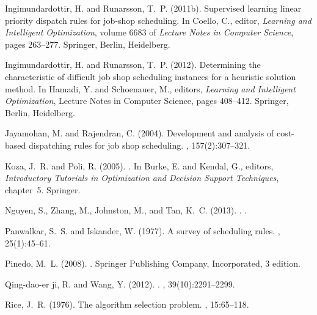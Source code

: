 \documentclass[a4paper,twoside]{article}
\begin{document}
{\begin{thebibliography}{}
Ingimundardottir, H. and Runarsson, T.~P. (2011b).
\newblock Supervised learning linear priority dispatch rules for job-shop
  scheduling.
\newblock In Coello, C., editor, {\em Learning and Intelligent Optimization},
  volume 6683 of {\em Lecture Notes in Computer Science}, pages 263--277.
  Springer, Berlin, Heidelberg.

Ingimundardottir, H. and Runarsson, T.~P. (2012).
\newblock Determining the characteristic of difficult job shop scheduling
  instances for a heuristic solution method.
\newblock In Hamadi, Y. and Schoenauer, M., editors, {\em Learning and
  Intelligent Optimization}, Lecture Notes in Computer Science, pages 408--412.
  Springer, Berlin, Heidelberg.

Jayamohan, M. and Rajendran, C. (2004).
\newblock Development and analysis of cost-based dispatching rules for job shop
  scheduling.
, 157(2):307--321.

Koza, J.~R. and Poli, R. (2005).
.
\newblock In Burke, E. and Kendal, G., editors, {\em Introductory Tutorials in
  Optimization and Decision Support Techniques}, chapter~5. Springer.

Nguyen, S., Zhang, M., Johnston, M., and Tan, K.~C. (2013).
.
.

Panwalkar, S.~S. and Iskander, W. (1977).
\newblock A survey of scheduling rules.
, 25(1):45--61.

Pinedo, M.~L. (2008).
.
\newblock Springer Publishing Company, Incorporated, 3 edition.

Qing-dao-er ji, R. and Wang, Y. (2012).
.
, 39(10):2291--2299.

Rice, J.~R. (1976).
\newblock The algorithm selection problem.
, 15:65--118.


\end{thebibliography}}
\end{document}
